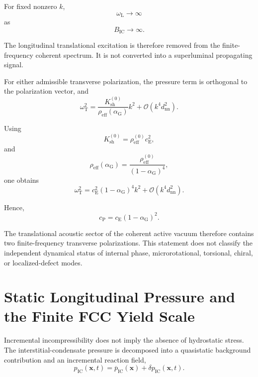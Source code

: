 For fixed nonzero $k$,
\begin{equation}
    \omega_{\mathrm{L}} \rightarrow \infty
\end{equation}
as
\begin{equation}
    B_{\mathrm{IC}} \rightarrow \infty.
\end{equation}

The longitudinal translational excitation is therefore removed from the finite-frequency coherent spectrum. It is not converted into a superluminal propagating signal.

For either admissible transverse polarization, the pressure term is orthogonal to the polarization vector, and
\begin{equation}
    \omega_{\mathrm{T}}^2 = \frac{K_{\mathrm{sh}}^{(0)}}{\rho_{\mathrm{eff}}(\alpha_{\mathrm{G}})}k^2 + \mathcal{O}\left(k^4d_{\mathrm{nn}}^2\right).
\end{equation}

Using
\begin{equation}
    K_{\mathrm{sh}}^{(0)} = \rho_{\mathrm{eff}}^{(0)}c_{\mathrm{E}}^2,
\end{equation}
and
\begin{equation}
    \rho_{\mathrm{eff}}(\alpha_{\mathrm{G}}) = \frac{\rho_{\mathrm{eff}}^{(0)}}{\left(1-\alpha_{\mathrm{G}}\right)^4},
\end{equation}
one obtains
\begin{equation}
    \omega_{\mathrm{T}}^2 = c_{\mathrm{E}}^2\left(1-\alpha_{\mathrm{G}}\right)^4k^2 + \mathcal{O}\left(k^4d_{\mathrm{nn}}^2\right).
\end{equation}

Hence,
\begin{equation}
    c_{\mathrm{P}} = c_{\mathrm{E}}\left(1-\alpha_{\mathrm{G}}\right)^2.
\end{equation}

The translational acoustic sector of the coherent active vacuum therefore contains two finite-frequency transverse polarizations. This statement does not classify the independent dynamical status of internal phase, microrotational, torsional, chiral, or localized-defect modes.

\section{Static Longitudinal Pressure and the Finite FCC Yield Scale}
\label{sec:AP_static_pressure_yield}

Incremental incompressibility does not imply the absence of hydrostatic stress. The interstitial-condensate pressure is decomposed into a quasistatic background contribution and an incremental reaction field,
\begin{equation}
    p_{\mathrm{IC}}(\mathbf{x},t) = \overline{p}_{\mathrm{IC}}(\mathbf{x}) + \delta p_{\mathrm{IC}}(\mathbf{x},t).
\end{equation}

